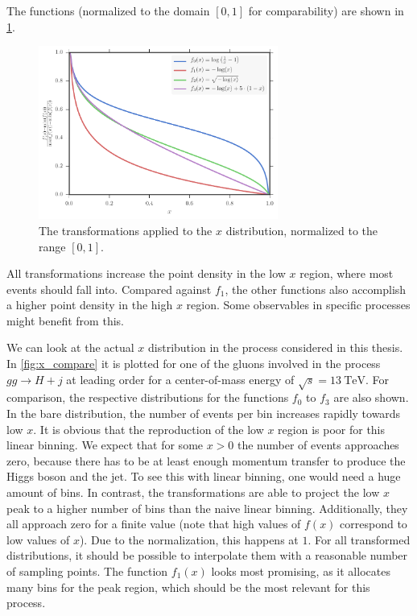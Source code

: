 The functions (normalized to the domain $[0,1]$ for comparability) are shown in \cref{fig:xtransform}.%
%
\begin{figure}[]
	\includegraphics[width=0.7\textwidth]{images/xtransform.pdf}
	\caption{The transformations applied to the $x$ distribution, normalized to the range $[0,1]$.}
	\label{fig:xtransform}
\end{figure}
%
All transformations increase the point density in the low $x$ region, where most events should fall into.
Compared against $f_1$, the other functions also accomplish a higher point density in the high $x$ region.
Some observables in specific processes might benefit from this.

We can look at the actual $x$ distribution in the process considered in this thesis.
In \cref{fig:x_compare} it is plotted for one of the gluons involved in the process $gg \rightarrow H + j$ at leading order for a center-of-mass energy of $\sqrt{s} = \SI{13}{\tera\electronvolt}$.
For comparison, the respective distributions for the functions $f_0$ to $f_3$ are also shown.
In the bare distribution, the number of events per bin increases rapidly towards low $x$.
It is obvious that the reproduction of the low $x$ region is poor for this linear binning.
We expect that for some $x>0$ the number of events approaches zero, because there has to be at least enough momentum transfer to produce the Higgs boson and the jet.
To see this with linear binning, one would need a huge amount of bins.
In contrast, the transformations are able to project the low $x$ peak to a higher number of bins than the naive linear binning.
Additionally, they all approach zero for a finite value (note that high values of $f(x)$ correspond to low values of $x$).
Due to the normalization, this happens at $1$.
For all transformed distributions, it should be possible to interpolate them with a reasonable number of sampling points.
The function $f_1(x)$ looks most promising, as it allocates many bins for the peak region, which should be the most relevant for this process.

